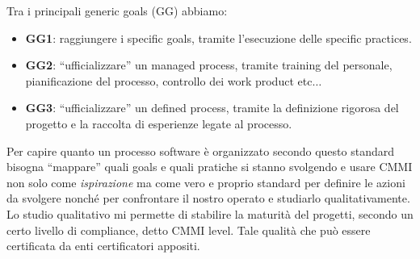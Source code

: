 \begin{itemize}
\begin{enumerate}
        Tra i principali generic goals (GG) abbiamo:
        \begin{itemize}
            \item \textbf{GG1}: raggiungere i specific goals, tramite l'esecuzione delle specific practices.
            \item \textbf{GG2}: “ufficializzare” un managed process, tramite training del personale, pianificazione del processo, controllo dei work product etc$\dots$
            \item \textbf{GG3}: “ufficializzare” un defined process, tramite la definizione rigorosa del progetto e la raccolta di esperienze legate al processo.
        \end{itemize}
    \end{enumerate} 
\end{itemize}

Per capire quanto un processo software è organizzato secondo questo standard bisogna “mappare” quali goals e quali pratiche si stanno svolgendo e usare CMMI non solo come \textit{ispirazione} ma come vero e proprio standard per definire le azioni da svolgere nonché per confrontare il nostro operato e studiarlo qualitativamente. Lo studio qualitativo mi permette di stabilire la maturità del progetti, secondo un certo livello di compliance, detto CMMI level. Tale qualità che può essere certificata da enti certificatori appositi.

